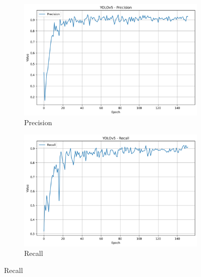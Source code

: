 \documentclass{article}
\begin{document}
\begin{figure}[h!]
  \centering
  \begin{subfigure}[b]{0.495\textwidth}
    \includegraphics[width=\linewidth]{Precision.png}
    \caption{Precision}
  \end{subfigure}
  \begin{subfigure}[b]{0.495\textwidth}
    \includegraphics[width=\linewidth]{Recall.png}
    \caption{Recall}
  \end{subfigure}
\end{figure}

\newpage
\end{document}
